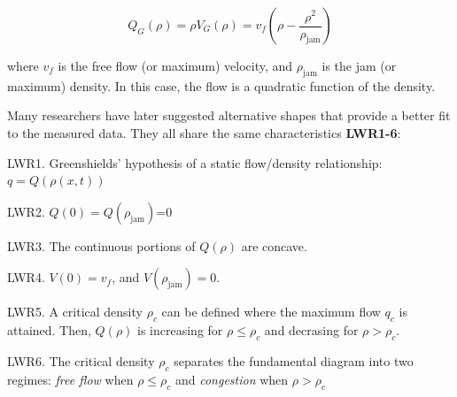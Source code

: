 \documentclass[11pt]{article}
\numberwithin{equation}{section}
\numberwithin{figure}{section}
\numberwithin{table}{section}
\begin{document}
\begin{equation} \label{eq:greenshieldsFlux}
Q_{G}(\rho) = \rho V_{G}(\rho) = v_{f}(\rho-\frac{\rho^{2}}{\rho_{\text{jam}}})
\end{equation}

where $v_{f}$ is the free flow (or maximum) velocity, and $\rho_{\text{jam}}$ is the jam (or maximum) density. In this case, the flow is a quadratic function of the density. 

Many researchers have later suggested alternative shapes that provide a better fit to the measured data. They all share the same characteristics \textbf{LWR1-6}:

LWR1. Greenshields' hypothesis of a static flow/density relationship: $q = Q(\rho(x,t))$

LWR2. $Q(0)=Q(\rho_{\text{jam}})$=0

LWR3. The continuous portions of $Q(\rho)$ are concave.

LWR4. $V(0) = v_{f}$, and $V(\rho_{\text{jam}}) = 0$.

LWR5. A critical density $\rho_{c}$ can be defined where the maximum flow $q_{c}$ is attained. Then, $Q(\rho)$ is increasing for $\rho \leq \rho_{c}$ and decrasing for $\rho > \rho_{c}$.

LWR6. The critical density $\rho_{c}$ separates the fundamental diagram into two regimes: \textit{free flow} when $\rho \leq \rho_{c}$ and \textit{congestion} when $\rho > \rho_{c}$
\end{document}
